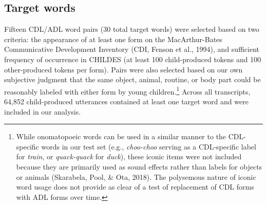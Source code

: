 \documentclass[10pt, letterpaper]{article}
\begin{document}
\hypertarget{target-words}{%
\subsection{Target words}\label{target-words}}

Fifteen CDL/ADL word pairs (30 total target words) were selected based
on two criteria: the appearance of at least one form on the
MacArthur-Bates Communicative Development Inventory (CDI, Fenson et al.,
1994), and sufficient frequency of occurrence in CHILDES (at least 100
child-produced tokens and 100 other-produced tokens per form). Pairs
were also selected based on our own subjective judgment that the same
object, animal, routine, or body part could be reasonably labeled with
either form by young children.\footnote{While onomatopoeic words can be
  used in a similar manner to the CDL-specific words in our test set
  (e.g., \emph{choo-choo} serving as a CDL-specific label for
  \emph{train}, or \emph{quack-quack} for \emph{duck}), these iconic
  items were not included because they are primarily used as sound
  effects rather than labels for objects or animals (Skarabela, Pool, \&
  Ota, 2018). The polysemous nature of iconic word usage does not
  provide as clear of a test of replacement of CDL forms with ADL forms
  over time.} Across all transcripts, 64,852 child-produced utterances
contained at least one target word and were included in our analysis.
\end{document}
